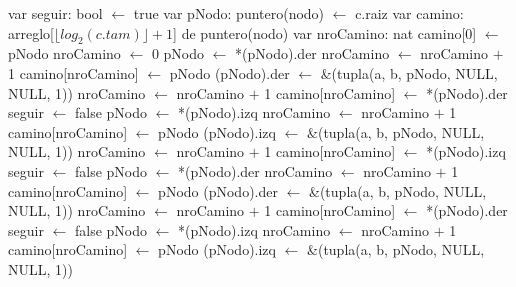 \begin{Algoritmos}
{	
		\State var seguir: bool $\gets$ true 
		\State var pNodo: puntero(nodo) $\gets$ c.raiz 
		\State var camino: arreglo[$\lfloor log_2(c.tam)\rfloor + 1$] de puntero(nodo) 
		\State var nroCamino: nat 
		\State camino[0] $\gets$ pNodo 
		\State nroCamino $\gets$ 0 
		 
			 
				 
					 
						 
							\State pNodo $\gets$ *(pNodo).der 
							\State nroCamino $\gets$ nroCamino $+$ 1 
							\State camino[nroCamino] $\gets$ pNodo 
						\Else
							\State *(pNodo).der $\gets$ \&(tupla(a, b, pNodo, NULL, NULL, 1)) 
							\State nroCamino $\gets$ nroCamino $+$ 1 
							\State camino[nroCamino] $\gets$ *(pNodo).der 
							\State seguir $\gets$ false 
						\EndIf
					\Else
						 
							\State pNodo $\gets$ *(pNodo).izq 
							\State nroCamino $\gets$ nroCamino $+$ 1 
							\State camino[nroCamino] $\gets$ pNodo 
						\Else
							\State *(pNodo).izq $\gets$ \&(tupla(a, b, pNodo, NULL, NULL, 1)) 
							\State nroCamino $\gets$ nroCamino $+$ 1 
							\State camino[nroCamino] $\gets$ *(pNodo).izq 
							\State seguir $\gets$ false 
						\EndIf
					\EndIf
				\Else
					 
						\State pNodo $\gets$ *(pNodo).der 
						\State nroCamino $\gets$ nroCamino $+$ 1 
						\State camino[nroCamino] $\gets$ pNodo 
					\Else
						\State *(pNodo).der $\gets$ \&(tupla(a, b, pNodo, NULL, NULL, 1)) 
						\State nroCamino $\gets$ nroCamino $+$ 1 
						\State camino[nroCamino] $\gets$ *(pNodo).der 
						\State seguir $\gets$ false 
					\EndIf					
				\EndIf
			\Else
				 
					\State pNodo $\gets$ *(pNodo).izq 
					\State nroCamino $\gets$ nroCamino $+$ 1 
					\State camino[nroCamino] $\gets$ pNodo 
				\Else
					\State *(pNodo).izq $\gets$ \&(tupla(a, b, pNodo, NULL, NULL, 1)) 
}
\end{Algoritmos}
